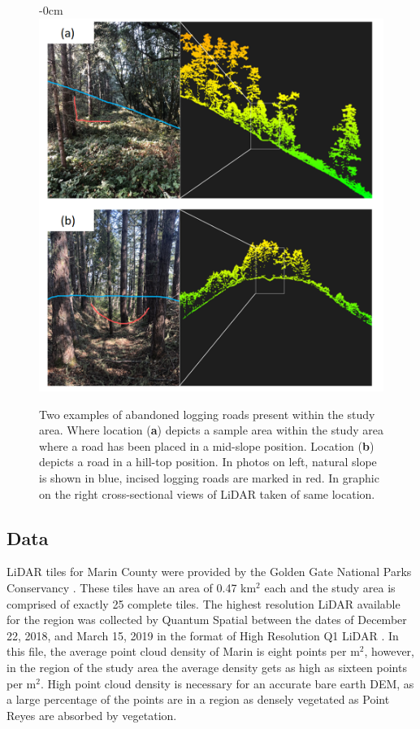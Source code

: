 \documentclass[remotesensing,article,submit,pdftex,moreauthors]{Definitions/mdpi}
\begin{document}
\begin{figure}[H]	
\begin{adjustwidth}{-\extralength}{0cm}
\centering
\includegraphics[width=15 cm]{roadtypes.png}
\end{adjustwidth}
\caption{Two examples of abandoned logging roads present within the study area. Where location (\textbf{a}) depicts a sample area within the study area where a road has been placed in a mid-slope position. Location (\textbf{b}) depicts a road in a hill-top position. In photos on left, natural slope is shown in blue, incised logging roads are marked in red. In graphic on the right cross-sectional views of LiDAR taken of same location.\label{fig2}}
\end{figure}  

\subsection{Data}

LiDAR tiles for Marin County were provided by the Golden Gate National Parks Conservancy \cite{becker}. These tiles have an area of 0.47 km$^2$ each and the study area is comprised of exactly 25 complete tiles. The highest resolution LiDAR available for the region was collected by Quantum Spatial between the dates of December 22, 2018, and March 15, 2019 in the format of High Resolution Q1 LiDAR \cite{quantum}. In this file, the average point cloud density of Marin is eight points per m$^2$, however, in the region of the study area the average density gets as high as sixteen points per m$^2$. High point cloud density is necessary for an accurate bare earth DEM, as a large percentage of the points are in a region as densely vegetated as Point Reyes \cite{sherba, white} are absorbed by vegetation.
\end{document}
